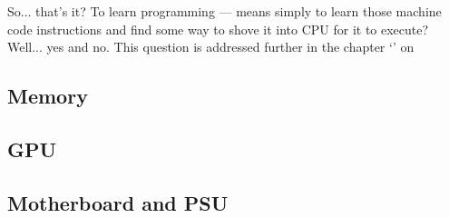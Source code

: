 \documentclass[../../what-is-computer.tex]{subfiles}
\begin{document}
    So... that's it? To learn programming --- means simply to learn those machine code instructions and find some way to shove it into CPU for it to execute?
    Well... yes and no. This question is addressed further in the chapter `' on~\pageref{chapter:why-computer}

    \subsection{Memory}\label{subsection:memory}
    \subsection{GPU}\label{subsection:gpu}
    \subsection{Motherboard and PSU}\label{subsection:motherboard-and-psu}
\end{document}
